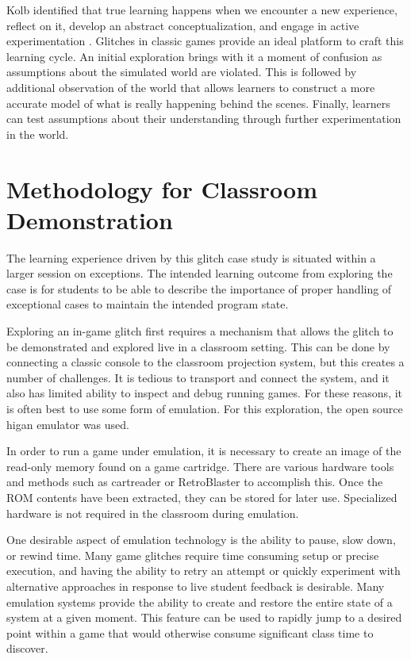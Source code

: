 \documentclass[letterpaper]{article}
\begin{document}
Kolb identified that true learning happens when we encounter a new experience, reflect on it, develop an abstract conceptualization, and engage in active experimentation \cite{kolb84}. Glitches in classic games provide an ideal platform to craft this learning cycle. An initial exploration brings with it a moment of confusion as assumptions about the simulated world are violated. This is followed by additional observation of the world that allows learners to construct a more accurate model of what is really happening behind the scenes. Finally, learners can test assumptions about their understanding through further experimentation in the world.

\section{Methodology for Classroom Demonstration}

The learning experience driven by this glitch case study is situated within a larger session on exceptions. The intended learning outcome from exploring the case is for students to be able to describe the importance of proper handling of exceptional cases to maintain the intended program state.

Exploring an in-game glitch first requires a mechanism that allows the glitch to be demonstrated and explored live in a classroom setting. This can be done by connecting a classic console to the classroom projection system, but this creates a number of challenges. It is tedious to transport and connect the system, and it also has limited ability to inspect and debug running games. For these reasons, it is often best to use some form of emulation. For this exploration, the open source higan\cite{ginder2004higan}  emulator was used.

In order to run a game under emulation, it is necessary to create an image of the read-only memory found on a game cartridge. There are various hardware tools and methods such as cartreader\cite{sanni_cartreader} or RetroBlaster\cite{retroblaster} to accomplish this. Once the ROM contents have been extracted, they can be stored for later use. Specialized hardware is not required in the classroom during emulation.

One desirable aspect of emulation technology is the ability to pause, slow down, or rewind time. Many game glitches require time consuming setup or precise execution, and having the ability to retry an attempt or quickly experiment with alternative approaches in response to live student feedback is desirable. Many emulation systems provide the ability to create and restore the entire state of a system at a given moment. This feature can be used to rapidly jump to a desired point within a game that would otherwise consume significant class time to discover.
\end{document}
